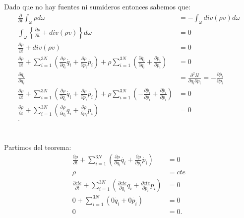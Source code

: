 \documentclass{report}
\begin{document}
Dado que no hay fuentes ni sumideros entonces sabemos que:
\begin{align*}
  \frac{\partial}{\partial t} \int_{\omega} \rho d\omega &= - \int_{\omega}div\left( \rho v \right) d\omega \\
  \int_{\omega}\left\{ \frac{\partial \rho}{\partial t} + div\left( \rho v \right)  \right\} d\omega &= 0 \\
  \frac{\partial \rho}{\partial t} + div\left( \rho v \right) &= 0 \\
  \frac{\partial \rho}{\partial t} + \sum_{i=1}^{3N} \left( \frac{\partial \rho}{\partial q_i} \dot{q_i} + \frac{\partial \rho}{\partial p_i} \dot{p_i} \right) + \rho \sum_{i=1}^{3N} \left( \frac{\partial \dot{q_i}}{\partial q_i}  + \frac{\partial \dot{p_i}}{\partial p_i}  \right) &= 0 \\
  \frac{\partial \dot{q_i}}{\partial q_i} &= \frac{\partial^2 H}{\partial q_i \partial p_i} = - \frac{\partial \dot{p_i}}{\partial p_i}  \\
  \frac{\partial \rho}{\partial t} + \sum_{i=1}^{3N} \left( \frac{\partial \rho}{\partial q_i} \dot{q_i} + \frac{\partial \rho}{\partial p_i} \dot{p_i} \right) + \rho \sum_{i=1}^{3N} \left( -\frac{\partial \dot{p_i}}{\partial p_i}  + \frac{\partial \dot{p_i}}{\partial p_i}  \right) &= 0 \\
  \frac{\partial \rho}{\partial t} + \sum_{i=1}^{3N} \left( \frac{\partial \rho}{\partial q_i} \dot{q_i} + \frac{\partial \rho}{\partial p_i} \dot{p_i} \right) &= 0 \\
.\end{align*}

\section{}

Partimos del teorema:
\begin{align*}
  \frac{\partial \rho}{\partial t} + \sum_{i=1}^{3N} \left( \frac{\partial \rho}{\partial q_i} \dot{q_i} + \frac{\partial \rho}{\partial p_i} \dot{p_i} \right) &= 0 \\
  \rho &= cte\\
  \frac{\partial cte}{\partial t} + \sum_{i=1}^{3N} \left( \frac{\partial cte}{\partial q_i} \dot{q_i} + \frac{\partial cte}{\partial p_i} \dot{p_i} \right) &= 0 \\
  0 + \sum_{i=1}^{3N} \left( 0 \dot{q_i} + 0 \dot{p_i} \right) &= 0 \\
  0 &= 0
.\end{align*}
\end{document}
